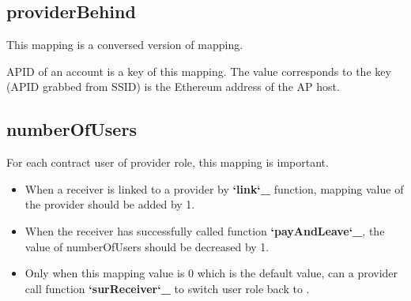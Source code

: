 \documentclass[letterpaper,10pt,english]{sphinxmanual}
\begin{document}
\subsection{providerBehind}
\label{\detokenize{ContractVariables:providerbehind}}
%
\begin{sphinxVerbatim}[commandchars=\\\{\}]
     
\end{sphinxVerbatim}

This mapping is a conversed version of {\hyperref[\detokenize{ContractVariables:apid}]{}} mapping.

APID of an account is a key of this mapping.
The value corresponds to the key (APID grabbed from SSID)
is the Ethereum address of the AP host.


\subsection{numberOfUsers}
\label{\detokenize{ContractVariables:numberofusers}}
%
\begin{sphinxVerbatim}[commandchars=\\\{\}]
     
\end{sphinxVerbatim}

For each contract user of provider role, this mapping is important.
\begin{itemize}
\item {} 
When a receiver is linked to a provider by {\color{red}\bfseries{}{}`link{}`\_} function, mapping value of the provider should be added by 1.

\item {} 
When the receiver has successfully called function {\color{red}\bfseries{}{}`payAndLeave{}`\_}, the value of numberOfUsers should be decreased by 1.

\item {} 
Only when this mapping value is 0 which is the default value, can a provider call function {\color{red}\bfseries{}{}`surReceiver{}`\_} to switch user role back to .

\end{itemize}
\end{document}
